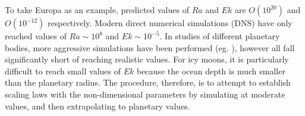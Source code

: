 \documentclass{article}
\def\lb{\left(}
\def\rb{\right)}
\begin{document}
%

To take Europa as an example, predicted values of $Ra$ and  $Ek$ are $O\lb 10^{20}\rb $ and $O\lb 10^{-12}\rb $ respectively. Modern direct numerical simulations (DNS) have only reached values of $Ra \sim 10^{8}$ and $Ek \sim 10^{-5}$\citep{dL23}. In studies of different planetary bodies, more aggressive simulations have been performed (eg. \citep{cG19,tG16,tO25}), however all fall significantly short of reaching realistic values. For icy moons, it is particularly difficult to reach small values of $Ek$ because the ocean depth is much smaller than the planetary radius. The procedure, therefore, is to attempt to establish scaling laws with the non-dimensional parameters by simulating at moderate values, and then extrapolating to planetary values.
\end{document}
